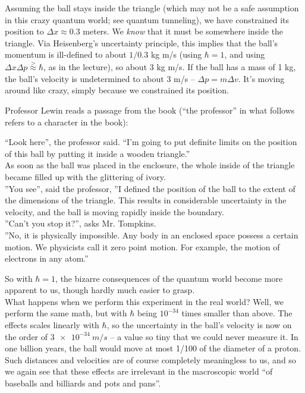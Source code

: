 \documentclass[8.01x]{subfiles}
\begin{document}
Assuming the ball stays inside the triangle (which may not be a safe assumption in this crazy quantum world; see quantum tunneling), we have constrained its position to $\Delta x \approx 0.3$ meters. We \emph{know} that it must be somewhere inside the triangle. Via Heisenberg's uncertainty principle, this implies that the ball's momentum is ill-defined to about $1/0.3$ kg m/s (using $\hbar = 1$, and using $\Delta x \Delta p \overset{>}{\approx} \hbar$, as in the lecture), so about 3 kg m/s. If the ball has a mass of 1 kg, the ball's velocity is undetermined to about 3 m/s -- $\Delta p = m \Delta v$. It's moving around like crazy, simply because we constrained its position.

Professor Lewin reads a passage from the book (``the professor'' in what follows refers to a character in the book):

``Look here'', the professor said. ``I'm going to put definite limits on the position of this ball by putting it inside a wooden triangle.''\\
As soon as the ball was placed in the enclosure, the whole inside of the triangle became filled up with the glittering of ivory.\\
''You see'', said the professor, ''I defined the position of the ball to the extent of the dimensions of the triangle. This results in considerable uncertainty in the velocity, and the ball is moving rapidly inside the boundary.\\
''Can't you stop it?'', asks Mr. Tompkins.\\
''No, it is physically impossible. Any body in an enclosed space possess a certain motion. We physicists call it zero point motion. For example, the motion of electrons in any atom.''

So with $\hbar = 1$, the bizarre consequences of the quantum world become more apparent to us, though hardly much easier to grasp.\\
What happens when we perform this experiment in the real world? Well, we perform the same math, but with $\hbar$ being $10^{-34}$ times smaller than above. The effects scales linearly with $\hbar$, so the uncertainty in the ball's velocity is now on the order of $\SI{3e-34}{m/s}$ -- a value so tiny that we could never measure it. In one billion years, the ball would move at most 1/100 of the diameter of a proton. Such distances and velocities are of course completely meaningless to us, and so we again see that these effects are irrelevant in the macroscopic world ``of baseballs and billiards and pots and pans''.
\end{document}
